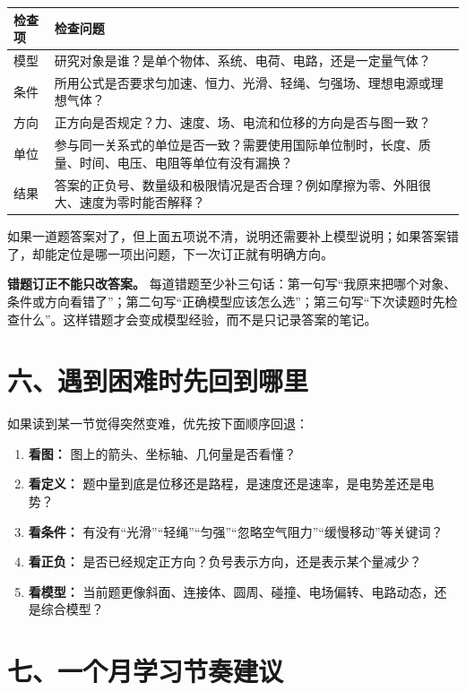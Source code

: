 \begin{center}
\begin{tabular}{p{}p{}}
\toprule
\textbf{检查项} & \textbf{检查问题} \\
\midrule
模型 & 研究对象是谁？是单个物体、系统、电荷、电路，还是一定量气体？ \\
条件 & 所用公式是否要求匀加速、恒力、光滑、轻绳、匀强场、理想电源或理想气体？ \\
方向 & 正方向是否规定？力、速度、场、电流和位移的方向是否与图一致？ \\
单位 & 参与同一关系式的单位是否一致？需要使用国际单位制时，长度、质量、时间、电压、电阻等单位有没有漏换？ \\
结果 & 答案的正负号、数量级和极限情况是否合理？例如摩擦为零、外阻很大、速度为零时能否解释？ \\
\bottomrule
\end{tabular}
\end{center}

如果一道题答案对了，但上面五项说不清，说明还需要补上模型说明；如果答案错了，却能定位是哪一项出问题，下一次订正就有明确方向。

\textbf{错题订正不能只改答案。} 每道错题至少补三句话：第一句写“我原来把哪个对象、条件或方向看错了”；第二句写“正确模型应该怎么选”；第三句写“下次读题时先检查什么”。这样错题才会变成模型经验，而不是只记录答案的笔记。

\section*{六、遇到困难时先回到哪里}

如果读到某一节觉得突然变难，优先按下面顺序回退：

\begin{enumerate}
  \item \textbf{看图：} 图上的箭头、坐标轴、几何量是否看懂？
  \item \textbf{看定义：} 题中量到底是位移还是路程，是速度还是速率，是电势差还是电势？
  \item \textbf{看条件：} 有没有“光滑”“轻绳”“匀强”“忽略空气阻力”“缓慢移动”等关键词？
  \item \textbf{看正负：} 是否已经规定正方向？负号表示方向，还是表示某个量减少？
  \item \textbf{看模型：} 当前题更像斜面、连接体、圆周、碰撞、电场偏转、电路动态，还是综合模型？
\end{enumerate}

\section*{七、一个月学习节奏建议}


